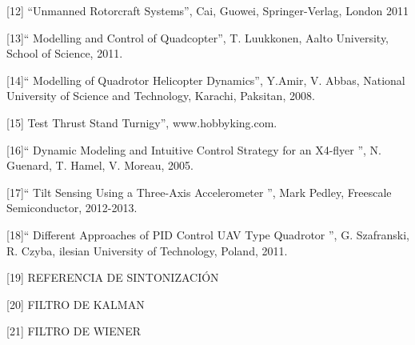 \documentclass[../main.tex]{subfiles}
\begin{document}
[12] ``Unmanned Rotorcraft Systems'', Cai, Guowei, Springer-Verlag, London 2011

[13]`` Modelling and Control of Quadcopter'', T. Luukkonen, Aalto University, School of Science, 2011.

[14]`` Modelling of Quadrotor Helicopter Dynamics'', Y.Amir, V. Abbas, National University of Science and Technology, 
Karachi, Paksitan, 2008.

[15] Test Thrust Stand Turnigy'', www.hobbyking.com. 

[16]`` Dynamic Modeling and Intuitive Control Strategy for an X4-flyer '', N. Guenard, T. Hamel, V. Moreau, 2005.

[17]`` Tilt Sensing Using a Three-Axis
Accelerometer '', Mark Pedley, Freescale Semiconductor, 2012-2013.

[18]`` Different Approaches of PID Control UAV Type Quadrotor '', G. Szafranski, R. Czyba, ilesian University of Technology, Poland, 2011.

[19] REFERENCIA DE SINTONIZACIÓN

[20] FILTRO DE KALMAN

[21] FILTRO DE WIENER

	\newpage
\end{document}
